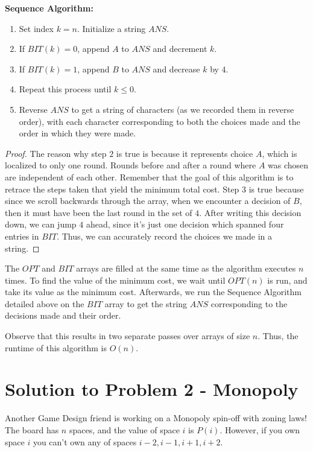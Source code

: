 \documentclass[11pt]{article}
\begin{document}
\textbf{Sequence Algorithm: }
\begin{enumerate}
	\item Set index $k = n$. Initialize a string $ANS$.
	\item If $BIT(k) = 0$, append $A$ to $ANS$ and decrement $k$. 
	\item If $BIT(k) = 1$, append $B$ to $ANS$ and decrease $k$ by $4$.
	\item Repeat this process until $k \leq 0$.
	\item Reverse $ANS$ to get a string of characters (as we recorded them in reverse order), with each character corresponding to both the choices made and the order in which they were made.
\end{enumerate}

\begin{proof}
The reason why step $2$ is true is because it represents choice $A$, which is localized to only one round. Rounds before and after a round where $A$ was chosen are independent of each other. Remember that the goal of this algorithm is to retrace the steps taken that yield the minimum total cost. Step $3$ is true because since we scroll backwards through the array, when we encounter a decision of $B$, then it must have been the last round in the set of $4$. After writing this decision down, we can jump $4$ ahead, since it's just one decision which spanned four entries in $BIT$. Thus, we can accurately record the choices we made in a string.
\end{proof}

The $OPT$ and $BIT$ arrays are filled at the same time as the algorithm executes $n$ times. To find the value of the minimum cost, we wait until $OPT(n)$ is run, and take its value as the minimum cost. Afterwards, we run the Sequence Algorithm detailed above on the $BIT$ array to get the string $ANS$ corresponding to the decisions made and their order.

Observe that this results in two separate passes over arrays of size $n$. Thus, the runtime of this algorithm is $O(n)$.

\pagebreak

\section*{Solution to Problem 2 - Monopoly}

Another Game Design friend is working on a Monopoly spin-off with zoning laws! The board has $n$ spaces, and the value of space $i$ is $P(i)$. However, if you own space $i$ you can't own any of spaces $i - 2, i - 1, i + 1, i + 2$.
\end{document}
